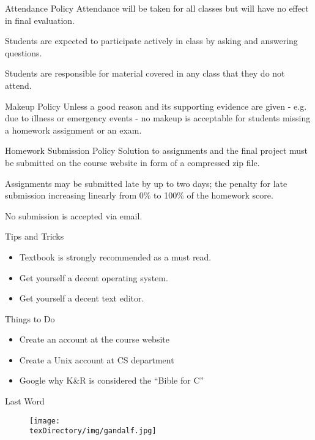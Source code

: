 \documentclass[compress]{beamer}
\begin{document}
\begin{slide}
	\begin{block}{Attendance Policy}
		Attendance will be taken for all classes but will have no effect in final evaluation.

		Students are expected to participate actively in class by asking and answering questions.

		Students are responsible for material covered in any class that they do not attend.
	\end{block}
\end{slide}

\begin{slide}
	\begin{block}{Makeup Policy}
		Unless a good reason and its supporting evidence are given - e.g. due to illness or emergency events - no makeup is acceptable for students missing a homework assignment or an exam.
	\end{block}
\end{slide}

\begin{slide}
	\begin{block}{Homework Submission Policy}
		Solution to assignments and the final project must be submitted on the course website in form of a compressed zip file.

		Assignments may be submitted late by up to two days; the penalty for late submission increasing linearly from 0\% to 100\% of the homework score.

		No submission is accepted via email.
	\end{block}
\end{slide}

\begin{slide}
	\begin{block}{Tips and Tricks}
		\begin{itemize}
			\item[] Textbook is strongly recommended as a must read.
			\item[] Get yourself a decent operating system.
			\item[] Get yourself a decent text editor.
		\end{itemize}
	\end{block}
\end{slide}

\begin{slide}
	\begin{block}{Things to Do}
		\begin{itemize}
			\item[] Create an account at the course website
			\item[] Create a Unix account at CS department
			\item[] Google why K\&R is considered the ``Bible for C''
		\end{itemize}
	\end{block}
\end{slide}

\begin{slide}
	\begin{block}{Last Word}
		\begin{figure}
		\texttt{[image: \\texDirectory/img/gandalf.jpg]}
		\end{figure}
	\end{block}
\end{slide}
\end{document}
